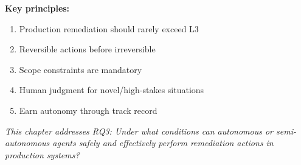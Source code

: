 \textbf{Key principles:}
\begin{enumerate}
    \item Production remediation should rarely exceed L3
    \item Reversible actions before irreversible
    \item Scope constraints are mandatory
    \item Human judgment for novel/high-stakes situations
    \item Earn autonomy through track record
\end{enumerate}

\textit{This chapter addresses RQ3: Under what conditions can autonomous or semi-autonomous agents safely and effectively perform remediation actions in production systems?}
